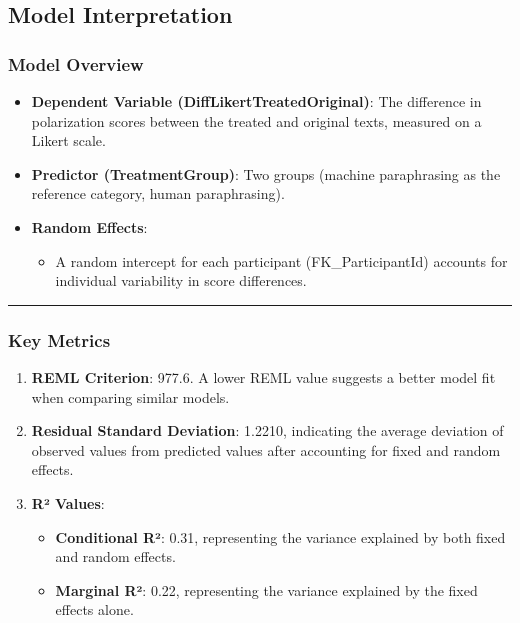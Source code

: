 \documentclass[
]{article}
\providecommand{\tightlist}{%
  \setlength{\itemsep}{0pt}\setlength{\parskip}{0pt}}
\begin{document}
\subsection{\texorpdfstring{\textbf{Model
Interpretation}}{Model Interpretation}}\label{model-interpretation-3}

\subsubsection{\texorpdfstring{\textbf{Model
Overview}}{Model Overview}}\label{model-overview-3}

\begin{itemize}
\tightlist
\item
  \textbf{Dependent Variable (DiffLikertTreatedOriginal)}: The
  difference in polarization scores between the treated and original
  texts, measured on a Likert scale.
\item
  \textbf{Predictor (TreatmentGroup)}: Two groups (machine paraphrasing
  as the reference category, human paraphrasing).
\item
  \textbf{Random Effects}:

  \begin{itemize}
  \tightlist
  \item
    A random intercept for each participant (FK\_ParticipantId) accounts
    for individual variability in score differences.
  \end{itemize}
\end{itemize}

\begin{center}\rule{0.5\linewidth}{0.5pt}\end{center}

\subsubsection{\texorpdfstring{\textbf{Key
Metrics}}{Key Metrics}}\label{key-metrics-3}

\begin{enumerate}
\def\labelenumi{\arabic{enumi}.}
\tightlist
\item
  \textbf{REML Criterion}: 977.6. A lower REML value suggests a better
  model fit when comparing similar models.
\item
  \textbf{Residual Standard Deviation}: 1.2210, indicating the average
  deviation of observed values from predicted values after accounting
  for fixed and random effects.
\item
  \textbf{R² Values}:

  \begin{itemize}
  \tightlist
  \item
    \textbf{Conditional R²}: 0.31, representing the variance explained
    by both fixed and random effects.
  \item
    \textbf{Marginal R²}: 0.22, representing the variance explained by
    the fixed effects alone.
  \end{itemize}
\end{enumerate}
\end{document}
